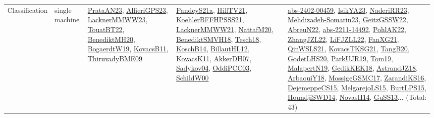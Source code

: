 {\begin{longtable}{lp{3cm}>{\raggedright}p{6cm}>{\raggedright}p{6cm}p{8cm}}
Classification & single machine & \href{articles/PrataAN23.pdf}{PrataAN23}\cite{PrataAN23}, \href{articles/AlfieriGPS23.pdf}{AlfieriGPS23}\cite{AlfieriGPS23}, \href{articles/LacknerMMWW23.pdf}{LacknerMMWW23}\cite{LacknerMMWW23}, \href{papers/TouatBT22.pdf}{TouatBT22}\cite{TouatBT22}, \href{articles/BenediktMH20.pdf}{BenediktMH20}\cite{BenediktMH20}, \href{papers/BogaerdtW19.pdf}{BogaerdtW19}\cite{BogaerdtW19}, \href{articles/KovacsB11.pdf}{KovacsB11}\cite{KovacsB11}, \href{papers/ThiruvadyBME09.pdf}{ThiruvadyBME09}\cite{ThiruvadyBME09} & \href{articles/PandeyS21a.pdf}{PandeyS21a}\cite{PandeyS21a}, \href{papers/HillTV21.pdf}{HillTV21}\cite{HillTV21}, \href{articles/KoehlerBFFHPSSS21.pdf}{KoehlerBFFHPSSS21}\cite{KoehlerBFFHPSSS21}, \href{papers/LacknerMMWW21.pdf}{LacknerMMWW21}\cite{LacknerMMWW21}, \href{papers/NattafM20.pdf}{NattafM20}\cite{NattafM20}, \href{papers/BenediktSMVH18.pdf}{BenediktSMVH18}\cite{BenediktSMVH18}, \href{papers/Tesch18.pdf}{Tesch18}\cite{Tesch18}, \href{papers/KoschB14.pdf}{KoschB14}\cite{KoschB14}, \href{papers/BillautHL12.pdf}{BillautHL12}\cite{BillautHL12}, \href{articles/KovacsK11.pdf}{KovacsK11}\cite{KovacsK11}, \href{papers/AkkerDH07.pdf}{AkkerDH07}\cite{AkkerDH07}, \href{papers/Sadykov04.pdf}{Sadykov04}\cite{Sadykov04}, \href{papers/OddiPCC03.pdf}{OddiPCC03}\cite{OddiPCC03}, \href{articles/SchildW00.pdf}{SchildW00}\cite{SchildW00} & \href{articles/abs-2402-00459.pdf}{abs-2402-00459}\cite{abs-2402-00459}, \href{articles/IsikYA23.pdf}{IsikYA23}\cite{IsikYA23}, \href{articles/NaderiRR23.pdf}{NaderiRR23}\cite{NaderiRR23}, \href{papers/Mehdizadeh-Somarin23.pdf}{Mehdizadeh-Somarin23}\cite{Mehdizadeh-Somarin23}, \href{papers/GeitzGSSW22.pdf}{GeitzGSSW22}\cite{GeitzGSSW22}, \href{articles/AbreuN22.pdf}{AbreuN22}\cite{AbreuN22}, \href{articles/abs-2211-14492.pdf}{abs-2211-14492}\cite{abs-2211-14492}, \href{articles/PohlAK22.pdf}{PohlAK22}\cite{PohlAK22}, \href{papers/ZhangJZL22.pdf}{ZhangJZL22}\cite{ZhangJZL22}, \href{papers/LiFJZLL22.pdf}{LiFJZLL22}\cite{LiFJZLL22}, \href{articles/FanXG21.pdf}{FanXG21}\cite{FanXG21}, \href{articles/QinWSLS21.pdf}{QinWSLS21}\cite{QinWSLS21}, \href{papers/KovacsTKSG21.pdf}{KovacsTKSG21}\cite{KovacsTKSG21}, \href{papers/TangB20.pdf}{TangB20}\cite{TangB20}, \href{papers/GodetLHS20.pdf}{GodetLHS20}\cite{GodetLHS20}, \href{papers/ParkUJR19.pdf}{ParkUJR19}\cite{ParkUJR19}, \href{papers/Tom19.pdf}{Tom19}\cite{Tom19}, \href{papers/MalapertN19.pdf}{MalapertN19}\cite{MalapertN19}, \href{articles/GedikKEK18.pdf}{GedikKEK18}\cite{GedikKEK18}, \href{papers/AstrandJZ18.pdf}{AstrandJZ18}\cite{AstrandJZ18}, \href{papers/ArbaouiY18.pdf}{ArbaouiY18}\cite{ArbaouiY18}, \href{papers/MossigeGSMC17.pdf}{MossigeGSMC17}\cite{MossigeGSMC17}, \href{articles/ZarandiKS16.pdf}{ZarandiKS16}\cite{ZarandiKS16}, \href{papers/DejemeppeCS15.pdf}{DejemeppeCS15}\cite{DejemeppeCS15}, \href{papers/MelgarejoLS15.pdf}{MelgarejoLS15}\cite{MelgarejoLS15}, \href{papers/BurtLPS15.pdf}{BurtLPS15}\cite{BurtLPS15}, \href{papers/HoundjiSWD14.pdf}{HoundjiSWD14}\cite{HoundjiSWD14}, \href{articles/NovasH14.pdf}{NovasH14}\cite{NovasH14}, \href{papers/GuSS13.pdf}{GuSS13}\cite{GuSS13}... (Total: 43)\\

\end{longtable}}
